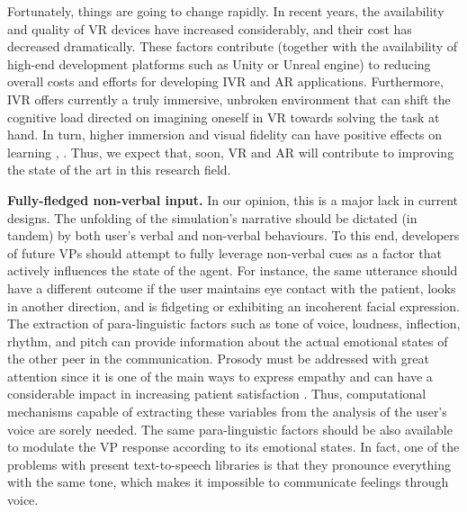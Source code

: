 Fortunately, things are going to change rapidly. In recent years, the availability and quality of VR devices have increased considerably, and their cost has decreased dramatically.  These factors contribute (together with the availability of high-end development platforms such as Unity or Unreal engine) to reducing overall costs and efforts for developing IVR and AR applications. Furthermore, IVR offers currently a truly immersive, unbroken environment that can shift the cognitive load directed on imagining oneself  in VR towards solving the task at hand. In turn, higher immersion and visual fidelity can have positive effects on learning \cite{coulter2007effect}, \cite{huerta2012measuring}. Thus, we expect that, soon, VR and AR will contribute to improving the state of the art in this research field.




\textbf{Fully-fledged non-verbal input.}
In our opinion, this is a major lack in current designs. The unfolding of the simulation's narrative should be dictated (in tandem) by both user's verbal and non-verbal behaviours. To this end, developers of future VPs should attempt to fully leverage non-verbal cues as a factor that actively influences the state of the agent. For instance, the same utterance should have a different outcome if the user maintains eye contact with the patient, looks in another direction, and is fidgeting or exhibiting an incoherent facial expression.
The extraction of para-linguistic factors such as tone of voice, loudness, inflection, rhythm, and pitch can provide information about the actual emotional states of the other peer in the communication. Prosody must be addressed with great attention since it is one of the main ways to express empathy and can have a considerable impact in increasing patient satisfaction \cite{kee2018communication}. Thus, computational mechanisms capable of extracting these variables from the analysis of the user's voice are sorely needed. 
The same para-linguistic factors should be also available to modulate the VP response according to its emotional states. In fact, one of the problems with present text-to-speech libraries is that they pronounce everything with the same tone, which makes it impossible to communicate feelings through voice. 
